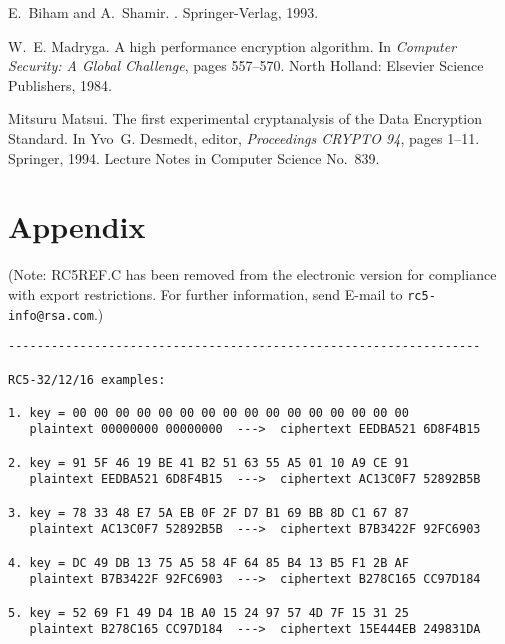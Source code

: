 % 
\begin{thebibliography}{1}

E.~Biham and A.~Shamir.
.
\newblock Springer-Verlag, 1993.

W.~E. Madryga.
\newblock A high performance encryption algorithm.
\newblock In {\em Computer Security: A Global Challenge}, pages 557--570. North
  Holland: Elsevier Science Publishers, 1984.

Mitsuru Matsui.
\newblock The first experimental cryptanalysis of the {D}ata {E}ncryption 
{S}tandard.
\newblock In Yvo~G. Desmedt, editor, {\em Proceedings CRYPTO 94}, pages 1--11.
  Springer, 1994.
\newblock Lecture Notes in Computer Science No.\ 839.

\end{thebibliography}

\newpage

\section{Appendix}

(Note: RC5REF.C has been removed from the electronic version for
compliance with export restrictions. For further information, send
E-mail to {\tt rc5-info@rsa.com}.)

\begin{verbatim}
------------------------------------------------------------------

RC5-32/12/16 examples:

1. key = 00 00 00 00 00 00 00 00 00 00 00 00 00 00 00 00 
   plaintext 00000000 00000000  --->  ciphertext EEDBA521 6D8F4B15  

2. key = 91 5F 46 19 BE 41 B2 51 63 55 A5 01 10 A9 CE 91 
   plaintext EEDBA521 6D8F4B15  --->  ciphertext AC13C0F7 52892B5B  

3. key = 78 33 48 E7 5A EB 0F 2F D7 B1 69 BB 8D C1 67 87 
   plaintext AC13C0F7 52892B5B  --->  ciphertext B7B3422F 92FC6903  

4. key = DC 49 DB 13 75 A5 58 4F 64 85 B4 13 B5 F1 2B AF 
   plaintext B7B3422F 92FC6903  --->  ciphertext B278C165 CC97D184  

5. key = 52 69 F1 49 D4 1B A0 15 24 97 57 4D 7F 15 31 25 
   plaintext B278C165 CC97D184  --->  ciphertext 15E444EB 249831DA  

\end{verbatim}




